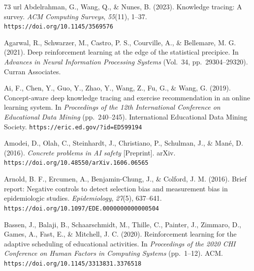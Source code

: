 \documentclass[a4paper,preprint,12pt,authoryear]{elsarticle}
\begin{document}
\begin{thebibliography}{73}
\expandafter\ifx\csname url\endcsname\relax
  \def\url#1{\texttt{#1}}\fi
{}
Abdelrahman, G., Wang, Q., \& Nunes, B. (2023). Knowledge tracing: A survey. \textit{ACM Computing Surveys}, \textit{55}(11), 1--37. \url{https://doi.org/10.1145/3569576}

Agarwal, R., Schwarzer, M., Castro, P. S., Courville, A., \& Bellemare, M. G. (2021). Deep reinforcement learning at the edge of the statistical precipice. In \textit{Advances in Neural Information Processing Systems} (Vol.~34, pp.~29304--29320). Curran Associates.

Ai, F., Chen, Y., Guo, Y., Zhao, Y., Wang, Z., Fu, G., \& Wang, G. (2019). Concept-aware deep knowledge tracing and exercise recommendation in an online learning system. In \textit{Proceedings of the 12th International Conference on Educational Data Mining} (pp.~240--245). International Educational Data Mining Society. \url{https://eric.ed.gov/?id=ED599194}

Amodei, D., Olah, C., Steinhardt, J., Christiano, P., Schulman, J., \& Man{\'e}, D. (2016). \textit{Concrete problems in AI safety} [Preprint]. arXiv. \url{https://doi.org/10.48550/arXiv.1606.06565}

Arnold, B. F., Ercumen, A., Benjamin-Chung, J., \& Colford, J. M. (2016). Brief report: Negative controls to detect selection bias and measurement bias in epidemiologic studies. \textit{Epidemiology}, \textit{27}(5), 637--641. \url{https://doi.org/10.1097/EDE.0000000000000504}

Bassen, J., Balaji, B., Schaarschmidt, M., Thille, C., Painter, J., Zimmaro, D., Games, A., Fast, E., \& Mitchell, J. C. (2020). Reinforcement learning for the adaptive scheduling of educational activities. In \textit{Proceedings of the 2020 CHI Conference on Human Factors in Computing Systems} (pp.~1--12). ACM. \url{https://doi.org/10.1145/3313831.3376518}


\end{thebibliography}
\end{document}
